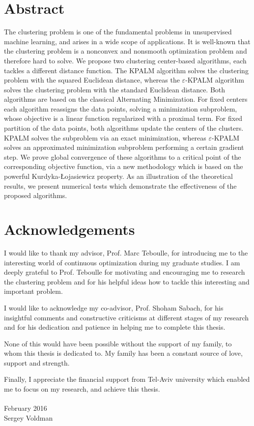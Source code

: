 \setcounter{page}{3}
\chapter*{Abstract}

The clustering problem is one of the fundamental problems in unsupervised machine learning, and arises in a wide scope of applications. It is well-known that the clustering problem is a nonconvex and nonsmooth optimization problem and therefore hard to solve. 
We propose two clustering center-based algorithms, each tackles a different distance function. The KPALM algorithm solves the clustering problem with the squared Euclidean distance, whereas the $\varepsilon$-KPALM algorithm solves the clustering problem with the standard Euclidean distance. 
Both algorithms are based on the classical Alternating Minimization. For fixed centers each algorithm reassigns the data points, solving a minimization subproblem, whose objective is a linear function regularized with a proximal term. For fixed partition of the data points, both algorithms update the centers of the clusters. KPALM solves the subproblem via an exact minimization, whereas $\varepsilon$-KPALM solves an approximated minimization subproblem performing a certain gradient step.
We prove global convergence of these algorithms to a critical point of the corresponding objective function, via a new methodology which is based on the powerful Kurdyka-{\L}ojasiewicz property. 
As an illustration of the theoretical results, we present numerical tests which demonstrate the effectiveness of the proposed algorithms.



\chapter*{Acknowledgements}

I would like to thank my advisor, Prof. Marc Teboulle, for introducing me to the interesting world of continuous optimization during my graduate studies. I am deeply grateful to Prof. Teboulle for motivating and encouraging me to research the clustering problem and for his helpful ideas how to tackle this interesting and important problem.

I would like to acknowledge my co-advisor, Prof. Shoham Sabach, for his insightful comments and constructive criticisms at different stages of my research and for his dedication and patience in helping me to complete this thesis.

None of this would have been possible without the support of my family, to whom this thesis is dedicated to. My family has been a constant source of love, support and strength.

Finally, I appreciate the financial support from Tel-Aviv university which enabled me to focus on my research, and achieve this thesis.
\\
\\
\noindent February 2016\\
\noindent Sergey Voldman



\nobreak
